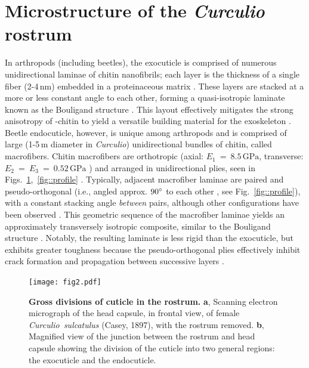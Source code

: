\documentclass[twocolumn, linenumbers, superscriptaddress, nofootinbib]{revtex4-1}
\begin{document}
	\section{Microstructure of the \textit{Curculio} rostrum}
		In arthropods (including beetles), the exocuticle is comprised of numerous unidirectional laminae of chitin nanofibrils; each layer is the thickness of a single fiber (2-4\,nm) embedded in a proteinaceous matrix \cite{Nikolov2010, Nikolov2011}.
		These layers are stacked at a more or less constant angle to each other, forming a quasi-isotropic laminate known as the Bouligand structure \cite{Blackwell1980, Bouligand1972, Neville1976}. 
		This layout effectively mitigates the strong anisotropy of \textalpha-chitin to yield a versatile building material for the exoskeleton \cite{Vincent1982, Vincent2004, Nikolov2010, Nikolov2011}.		
		Beetle endocuticle, however, is unique among arthropods and is comprised of large (1-5\,{\textmu}m diameter in \textit{Curculio}) unidirectional bundles of chitin, called macrofibers.
		Chitin macrofibers are orthotropic (axial: $E_1~=~8.5\,\text{GPa}$, transverse: $ E_2~=~E_3~=~0.52\,\text{GPa}$ \cite{Jansen2016}) and arranged in unidirectional plies, seen in Figs.~\ref{fig::cuticle},~\ref{fig::profile} \cite{Kamp2010, Kamp2015}.
		Typically, adjacent macrofiber laminae are paired and pseudo-orthogonal (i.e., angled approx. $90\degree$ to each other \cite{Cheng2009}, see Fig.~\ref{fig::profile}), with a constant stacking angle \emph{between} pairs, although other configurations have been observed \cite{Hepburn1973, Kamp2010, Kamp2015, Leopold1992}.
		This geometric sequence of the macrofiber laminae yields an approximately transversely isotropic composite, similar to the Bouligand structure \cite{Kamp2015, Nikolov2010}.
		Notably, the resulting laminate is less rigid than the exocuticle, but exhibits greater toughness because the pseudo-orthogonal plies effectively inhibit crack formation and propagation between successive layers \cite{Kamp2010, Kamp2015, Hepburn1973}.
		
		\begin{figure}
			\centering
			\texttt{[image: fig2.pdf]}
			\caption{\textbf{Gross divisions of cuticle in the rostrum.}
				\textbf{a}, Scanning electron micrograph of the head capsule, in frontal view, of female \textit{Curculio~sulcatulus} (Casey, 1897), with the rostrum removed.
				\textbf{b}, Magnified view of the junction between the rostrum and head capsule showing the division of the cuticle into two general regions: the exocuticle and the endocuticle.
			}
			\label{fig::cuticle}
		\end{figure}
		
\end{document}
